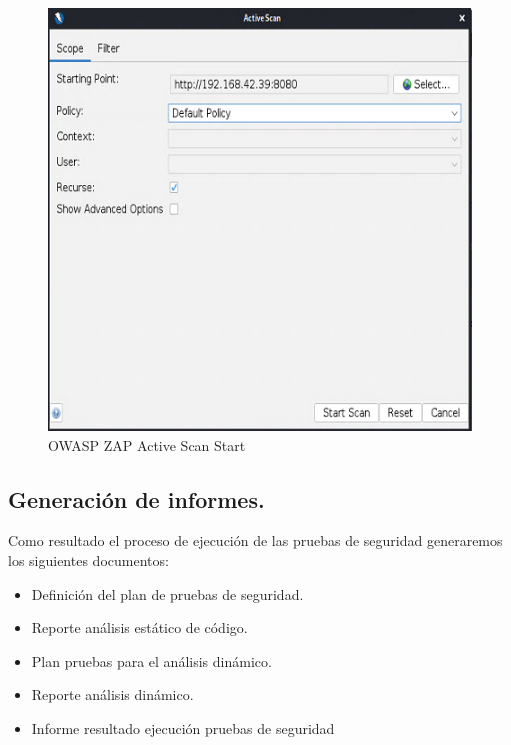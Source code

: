 \begin{figure}[!htb]
    \centering
    \captionsetup{width=1\linewidth}   
    \includegraphics[scale=0.7]{./imagenes/03_03_WebGoat_ZapProxyActiveScanStart.png}
    \caption{OWASP ZAP Active Scan Start}  
    \label{fig:OWASPZap Active Scan Start}
\end{figure}

\clearpage
\newpage

\subsection{Generación de informes.}

Como resultado el proceso de ejecución de las pruebas de seguridad generaremos los siguientes documentos:

\begin{itemize}
    \item Definición del plan de pruebas de seguridad.
    \item Reporte análisis estático de código.
    \item Plan pruebas para el análisis dinámico.
    \item Reporte análisis dinámico.
    \item Informe resultado ejecución pruebas de seguridad
\end{itemize}

\clearpage
\newpage

